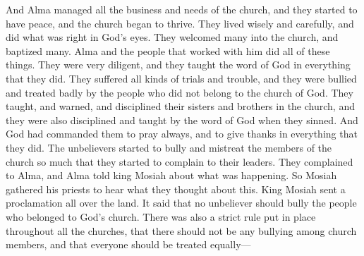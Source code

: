 And Alma managed all the business and needs of the church, and they started to have peace, and the church began to thrive. They lived wisely and carefully, and did what was right in God's eyes. They welcomed many into the church, and baptized many.
\bverse \iffalse And now all these things did Alma and his fellow laborers do who were over the church, walking in all diligence, teaching the word of God in all things, suffering all manner of afflictions, being persecuted by all those who did not belong to the church of God. \fi
Alma and the people that worked with him did all of these things. They were very diligent, and they taught the word of God in everything that they did. They suffered all kinds of trials and trouble, and they were bullied and treated badly by the people who did not belong to the church of God.
\bverse \iffalse And they did admonish their brethren; and they were also admonished, every one by the word of God, according to his sins, or to the sins which he had committed, being commanded of God to pray without ceasing, and to give thanks in all things. \fi
They taught, and warned, and disciplined their sisters and brothers in the church, and they were also disciplined and taught by the word of God when they sinned. And God had commanded them to pray always, and to give thanks in everything that they did.
\bchapter
\bverse \iffalse And now it came to pass that the persecutions which were inflicted on the church by the unbelievers became so great that the church began to murmur, and complain to their leaders concerning the matter; and they did complain to Alma. And Alma laid the case before their king, Mosiah. And Mosiah consulted with his priests. \fi
The unbelievers started to bully and mistreat the members of the church so much that they started to complain to their leaders. They complained to Alma, and Alma told king Mosiah about what was happening. So Mosiah gathered his priests to hear what they thought about this.
\bverse \iffalse And it came to pass that king Mosiah sent a proclamation throughout the land round about that there should not any unbeliever persecute any of those who belonged to the church of God. \fi
King Mosiah sent a proclamation all over the land. It said that no unbeliever should bully the people who belonged to God's church.
\bverse \iffalse And there was a strict command throughout all the churches that there should be no persecutions among them, that there should be an equality among all men; \fi
There was also a strict rule put in place throughout all the churches, that there should not be any bullying among church members, and that everyone should be treated equally---
